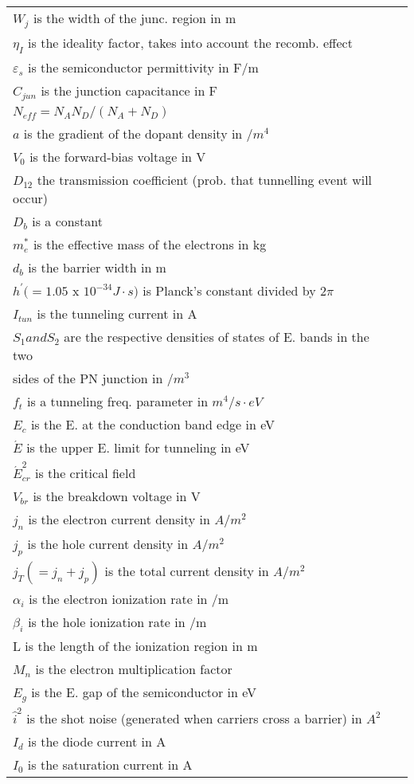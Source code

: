 \documentclass[10pt,landscape]{article}
\begin{document}
\begin{multicols}{3}
\begin{tabular}{@{}ll@{}}
$ W_j$ is the width of the junc. region in m\\
$ \eta_I$ is the ideality factor, takes into account the recomb. effect \\
$ \varepsilon_s$ is the semiconductor permittivity in F/m \\
$ C_{jun}$ is the junction capacitance in F \\
$ N_{eff}=N_AN_D/(N_A+N_D)$ \\
$ a$ is the gradient of the dopant density in $/m^4$ \\
$ V_0$ is the forward-bias voltage in V \\
$ D_{12}$ the transmission coefficient (prob. that tunnelling event will occur) \\
$ D_b$ is a constant \\
$ m^*_e$ is the effective mass of the electrons in kg \\
$ d_b$ is the barrier width in m \\
$ h^{\prime} (=1.05$ x $10^{-34}J\cdot s)$ is Planck's constant divided by $2\pi$\\
$ I_{tun}$ is the tunneling current in A \\
$ S_1 and S_2$ are the respective densities of states of E. bands in the two \\
sides of the PN junction in $ /m^3$ \\
$ f_t$ is a tunneling freq. parameter in $m^4/s\cdot eV$ \\
$ E_c$ is the E. at the conduction band edge in eV\\
$ \acute E$ is the upper E. limit for tunneling in eV \\
$ \acute{E}^2_{cr}$ is the critical field \\
$ V_{br}$ is the breakdown voltage in V \\
$ j_n$ is the electron current density in $A/m^2$ \\
$ j_p$ is the hole current density in $A/m^2$ \\
$ j_T (=j_n+j_p)$ is the total current density in $A/m^2$ \\
$ \alpha_i$ is the electron ionization rate in /m \\
$ \beta_i$ is the hole ionization rate in /m \\
L is the length of the ionization region in m \\
$ M_n$ is the electron multiplication factor \\
$ E_g$ is the E. gap of the semiconductor in eV \\
$ \hat{i}^2$ is the shot noise (generated when carriers cross a barrier) in $A^2$  \\
$ I_d$ is the diode current in A \\
$ I_0$ is the saturation current in A \\
\end{tabular}


\end{multicols}
\end{document}
